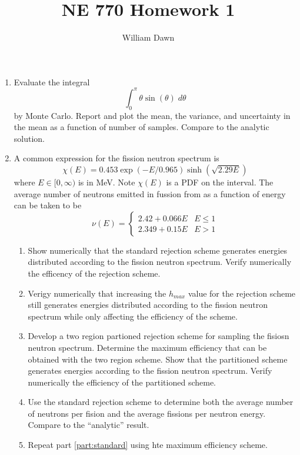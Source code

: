 \documentclass{article}
\title{NE 770 Homework 1}
\author{William Dawn}
\begin{document}
\maketitle

\begin{enumerate}
  \item Evaluate the integral
    \begin{equation}
        \int_0^{\pi} \theta \sin(\theta) \; d\theta
    \end{equation}
    by Monte Carlo. Report and plot the mean, the variance, and uncertainty in
    the mean as a function of number of samples. Compare to the analytic 
    solution.
  \item A common expression for the fission neutron spectrum is 
    \begin{equation}
      \chi(E) = 0.453 \exp(-E/0.965) \sinh\left(\sqrt{2.29E}\right)
    \end{equation}
    where $E \in [0,\infty)$ is in MeV. Note $\chi(E)$ is a PDF on the
    interval. The average number of neutrons emitted in fussion from 
     as a function of energy can be taken to be
    \begin{equation}
      \nu(E) = 
      \begin{cases}
        2.42 + 0.066 E & E \le 1 \\
        2.349 + 0.15 E & E >   1
      \end{cases}
    \end{equation}
    \begin{enumerate}
      \item Show numerically that the standard rejection scheme generates
        energies distributed according to the fission neutron spectrum. Verify
        numerically the efficency of the rejection scheme.
      \item Verigy numerically that increasing the $h_{max}$ value for the
        rejection scheme still generates energies distributed according to the
        fission neutron spectrum while only affecting the efficiency of the
        scheme.
      \item Develop a two region partioned rejection scheme for sampling the
        fisiosn neutron spectrum. Determine the maximum efficiency that can be
        obtained with the two region scheme. Show that the partitioned scheme
        generates energies according to the fission neutron spectrum. Verify
        numerically the efficiency of the partitioned scheme.
      \item 
        \label{part:standard}
        Use the standard rejection scheme to determine both the average
        number of neutrons per fision and the average fissions per neutron
        energy. Compare to the ``analytic'' result.
      \item Repeat part \ref{part:standard} using hte maximum efficiency scheme.
    \end{enumerate}
\end{enumerate}
\end{document}
